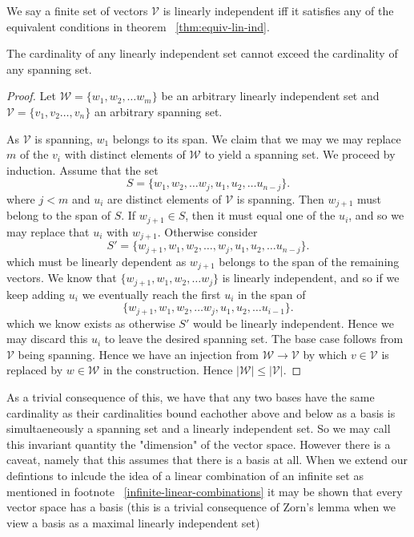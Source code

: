 \documentclass[]{article}
\begin{document}
\begin{defi} 
		We say a finite set of vectors $\mathcal{V}$ is linearly independent iff it satisfies any of the equivalent conditions in theorem ~\ref{thm:equiv-lin-ind}.
\end{defi}

\begin{thm}
	The cardinality of any linearly independent set cannot exceed the cardinality of any spanning set.
\end{thm}

\begin{proof}
		Let $\mathcal{W} = \{w_1, w_2, \ldots w_m\}$ be an arbitrary linearly independent set and $\mathcal{V} = \{v_1, v_2 \ldots, v_n\}$ an arbitrary spanning set.
		
		As $\mathcal{V}$ is spanning, $w_1$ belongs to its span. We claim that we may we may replace $m$ of the $v_i$ with distinct elements of $\mathcal{W}$ to yield a spanning set. We proceed by induction. Assume that the set 
		\[
		S = \{w_1, w_2, \ldots w_j, u_1, u_2, \ldots u_{n-j}\}
		.\] 
		where $j < m$ and $u_i$ are distinct elements of $\mathcal{V}$ is spanning. Then $w_{j+1}$ must belong to the span of $S$. If $w_{j+1} \in S$, then it must equal one of the $u_i$, and so we may replace that $u_i$ with $w_{j+1}$. Otherwise consider 
		\[
		S' = \{w_{j+1}, w_1, w_2, \ldots, w_j, u_1, u_2, \ldots u_{n-j}\} 
		.\] 
		which must be linearly dependent as $w_{j+1}$ belongs to the span of the remaining vectors. We know that $\{w_{j+1}, w_1, w_2, \ldots w_j\}$ is linearly independent, and so if we keep adding $u_i$ we eventually reach the first $u_i$ in the span of 
		\[
		\{w_{j+1}, w_1, w_2, \ldots w_j, u_1, u_2, \ldots u_{i-1}\}
		.\] 
	which we know exists as otherwise $S'$ would be linearly independent. Hence we may discard this $u_i$ to leave the desired spanning set. The base case follows from $\mathcal{V}$ being spanning. Hence we have an injection from $\mathcal{W} \to \mathcal{V}$ by which $v \in \mathcal{V}$ is replaced by $w \in \mathcal{W}$ in the construction. Hence $|\mathcal{W}| \leq |\mathcal{V}|$.
\end{proof}

As a trivial consequence of this, we have that any two bases have the same cardinality as their cardinalities bound eachother above and below as a basis is simultaeneously a spanning set and a linearly independent set. So we may call this invariant quantity the "dimension" of the vector space. However there is a caveat, namely that this assumes that there is a basis at all. When we extend our defintions to inlcude the idea of a linear combination of an infinite set as mentioned in footnote ~\ref{infinite-linear-combinations} it may be shown that every vector space has a basis (this is a trivial consequence of Zorn's lemma when we view a basis as a maximal linearly independent set)
\end{document}
